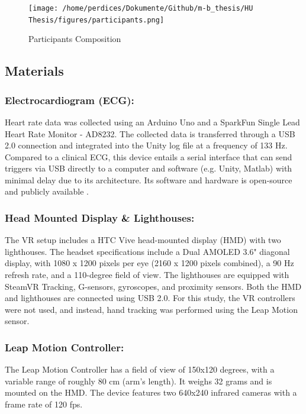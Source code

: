 \documentclass[12pt,oneside,openright]{report}
\begin{document}
\begin{figure}[h]
    \centering
    \texttt{[image: /home/perdices/Dokumente/Github/m-b\_thesis/HU Thesis/figures/participants.png]}
    \caption{Participants Composition}
    \label{fig:mesh1}
\end{figure}

    
\subsection*{Materials}
\subsubsection*{Electrocardiogram (ECG):}
Heart rate data was collected using an Arduino Uno and a SparkFun Single Lead Heart Rate Monitor - AD8232. The collected data is transferred through a USB 2.0 connection and integrated into the Unity log file at a frequency of 133 Hz. Compared to a clinical ECG, this device entails a serial interface that can send triggers via USB directly to a computer and software (e.g. Unity, Matlab) with minimal delay due to its architecture. Its software and hardware is open-source and publicly available \parencite{TimsECG}.

\subsubsection*{Head Mounted Display \& Lighthouses:}
The VR setup includes a HTC Vive head-mounted display (HMD) with two lighthouses. The headset specifications include a Dual AMOLED 3.6" diagonal display, with 1080 x 1200 pixels per eye (2160 x 1200 pixels combined), a 90 Hz refresh rate, and a 110-degree field of view. The lighthouses are equipped with SteamVR Tracking, G-sensors, gyroscopes, and proximity sensors. Both the HMD and lighthouses are connected using USB 2.0. For this study, the VR controllers were not used, and instead, hand tracking was performed using the Leap Motion sensor.

\subsubsection*{Leap Motion Controller:}
The Leap Motion Controller has a field of view of 150x120 degrees, with a variable range of roughly 80 cm (arm's length). It weighs 32 grams and is mounted on the HMD. The device features two 640x240 infrared cameras with a frame rate of 120 fps.
\end{document}
